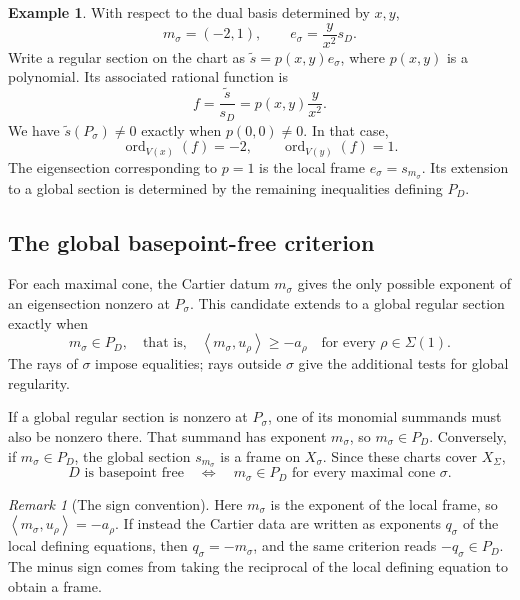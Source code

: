 \documentclass[11pt]{article}
\theoremstyle{definition}
\newtheorem{Ex}{Example}
\theoremstyle{remark}
\newtheorem{Rmk}{Remark}
\DeclareMathOperator{\ord}{ord}
\newcommand{\Sg}{\Sigma}
\newcommand{\braket}[2]{\left\langle #1,#2\right\rangle}
\begin{document}
\begin{Ex}
    With respect to the dual basis determined by \(x,y\),
    \[
        m_\sigma=(-2,1),\qquad
        e_\sigma=\frac{y}{x^2}s_D.
    \]
    Write a regular section on the chart as
    \(\widetilde{s}=p(x,y)e_\sigma\), where \(p(x,y)\) is a polynomial.
    Its associated rational function is
    \[
        f=\frac{\widetilde{s}}{s_D}
          =p(x,y)\frac{y}{x^2}.
    \]
    We have \(\widetilde{s}(P_\sigma)\ne0\) exactly when
    \(p(0,0)\ne0\). In that case,
    \[
        \ord_{V(x)}(f)=-2,\qquad \ord_{V(y)}(f)=1.
    \]
    The eigensection corresponding to \(p=1\) is the local frame
    \(e_\sigma=s_{m_\sigma}\). Its extension to a global section is
    determined by the remaining inequalities defining \(P_D\).
\end{Ex}

\subsection{The global basepoint-free criterion}

For each maximal cone, the Cartier datum \(m_\sigma\) gives the only
possible exponent of an eigensection nonzero at \(P_\sigma\). This
candidate extends to a global regular section exactly when
\[
    m_\sigma\in P_D,
    \quad\text{that is,}\quad
    \braket{m_\sigma}{u_\rho}\geq-a_\rho
    \quad\text{for every }\rho\in\Sg(1).
\]
The rays of \(\sigma\) impose equalities; rays outside \(\sigma\)
give the additional tests for global regularity.

If a global regular section is nonzero at \(P_\sigma\), one of its
monomial summands must also be nonzero there. That summand has exponent
\(m_\sigma\), so \(m_\sigma\in P_D\). Conversely, if
\(m_\sigma\in P_D\), the global section \(s_{m_\sigma}\) is a frame
on \(X_\sigma\). Since these charts cover \(X_\Sg\),
\[
    \boxed{D\text{ is basepoint free}
    \quad\Longleftrightarrow\quad
    m_\sigma\in P_D\text{ for every maximal cone }\sigma.}
\]

\begin{Rmk}[The sign convention]
    Here \(m_\sigma\) is the exponent of the local frame, so
    \(\braket{m_\sigma}{u_\rho}=-a_\rho\). If instead the Cartier
    data are written as exponents \(q_\sigma\) of the local defining
    equations, then \(q_\sigma=-m_\sigma\), and the same criterion
    reads \(-q_\sigma\in P_D\). The minus sign comes from taking the
    reciprocal of the local defining equation to obtain a frame.
\end{Rmk}
\end{document}

